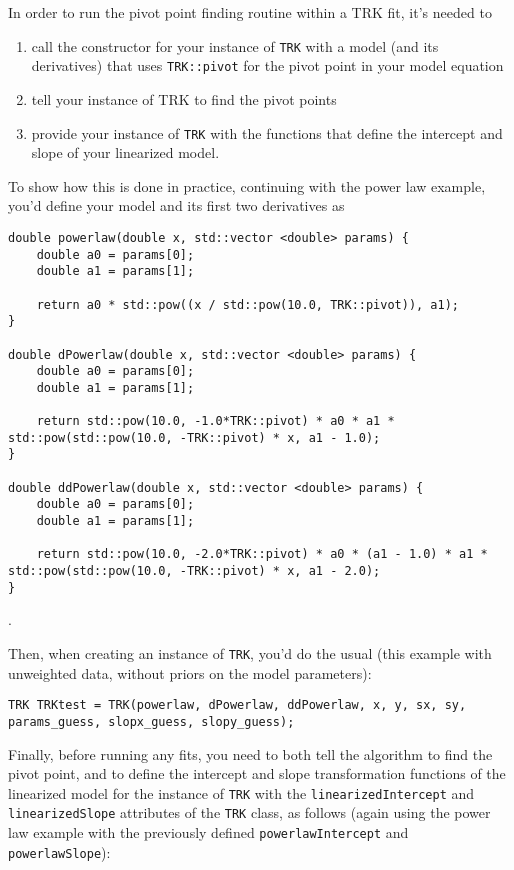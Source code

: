 \documentclass[12pt]{article}
\newcommand{\li}{\lstinline}
\begin{document}
In order to run the pivot point finding routine within a TRK fit, it's needed to
\begin{enumerate}
    \item call the constructor for your instance of \li{TRK} with a model (and its derivatives) that uses \li{TRK::pivot} for the pivot point in your model equation
    \item tell your instance of TRK to find the pivot points
    \item provide your instance of \li{TRK} with the functions that define the intercept and slope of your linearized model.
\end{enumerate}

To show how this is done in practice, continuing with the power law example, you'd define your model and its first two derivatives as

\begin{lstlisting}
double powerlaw(double x, std::vector <double> params) {
	double a0 = params[0];
	double a1 = params[1];

	return a0 * std::pow((x / std::pow(10.0, TRK::pivot)), a1);
}

double dPowerlaw(double x, std::vector <double> params) {
	double a0 = params[0];
	double a1 = params[1];

	return std::pow(10.0, -1.0*TRK::pivot) * a0 * a1 * std::pow(std::pow(10.0, -TRK::pivot) * x, a1 - 1.0);
}

double ddPowerlaw(double x, std::vector <double> params) {
	double a0 = params[0];
	double a1 = params[1];

	return std::pow(10.0, -2.0*TRK::pivot) * a0 * (a1 - 1.0) * a1 * std::pow(std::pow(10.0, -TRK::pivot) * x, a1 - 2.0);
}
\end{lstlisting}.

Then, when creating an instance of \li{TRK}, you'd do the usual (this example with unweighted data, without priors on the model parameters):

\begin{lstlisting}
TRK TRKtest = TRK(powerlaw, dPowerlaw, ddPowerlaw, x, y, sx, sy, params_guess, slopx_guess, slopy_guess);
\end{lstlisting}

Finally, before running any fits, you need to both tell the algorithm to find the pivot point, and to define the intercept and slope transformation functions of the linearized model for the instance of \li{TRK} with the \li{linearizedIntercept} and \li{linearizedSlope} attributes of the \li{TRK} class, as follows (again using the power law example with the previously defined \li{powerlawIntercept} and \li{powerlawSlope}):
\end{document}
